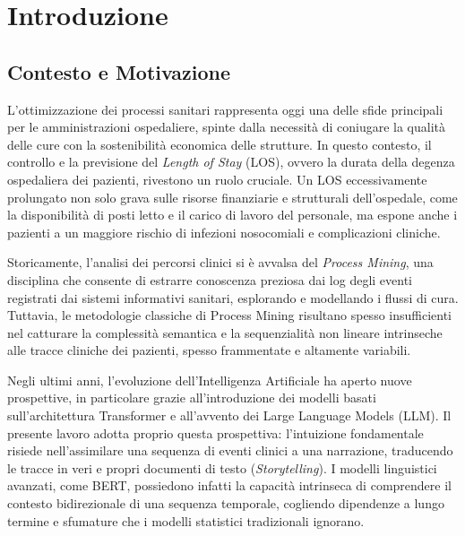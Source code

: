 
\chapter{Introduzione}
\label{ch:introduzione}

\section{Contesto e Motivazione}
L'ottimizzazione dei processi sanitari rappresenta oggi una delle sfide principali per le amministrazioni ospedaliere, spinte dalla necessità di coniugare la qualità delle cure con la sostenibilità economica delle strutture. In questo contesto, il controllo e la previsione del \textit{Length of Stay} (LOS), ovvero la durata della degenza ospedaliera dei pazienti, rivestono un ruolo cruciale. Un LOS eccessivamente prolungato non solo grava sulle risorse finanziarie e strutturali dell'ospedale, come la disponibilità di posti letto e il carico di lavoro del personale, ma espone anche i pazienti a un maggiore rischio di infezioni nosocomiali e complicazioni cliniche.

Storicamente, l'analisi dei percorsi clinici si è avvalsa del \textit{Process Mining}, una disciplina che consente di estrarre conoscenza preziosa dai log degli eventi registrati dai sistemi informativi sanitari, esplorando e modellando i flussi di cura. Tuttavia, le metodologie classiche di Process Mining risultano spesso insufficienti nel catturare la complessità semantica e la sequenzialità non lineare intrinseche alle tracce cliniche dei pazienti, spesso frammentate e altamente variabili.

Negli ultimi anni, l'evoluzione dell'Intelligenza Artificiale ha aperto nuove prospettive, in particolare grazie all'introduzione dei modelli basati sull'architettura Transformer \cite{vaswani2017attention} e all'avvento dei Large Language Models (LLM). Il presente lavoro adotta proprio questa prospettiva: l'intuizione fondamentale risiede nell'assimilare una sequenza di eventi clinici a una narrazione, traducendo le tracce in veri e propri documenti di testo (\textit{Storytelling}). I modelli linguistici avanzati, come BERT, possiedono infatti la capacità intrinseca di comprendere il contesto bidirezionale di una sequenza temporale, cogliendo dipendenze a lungo termine e sfumature che i modelli statistici tradizionali ignorano. 

